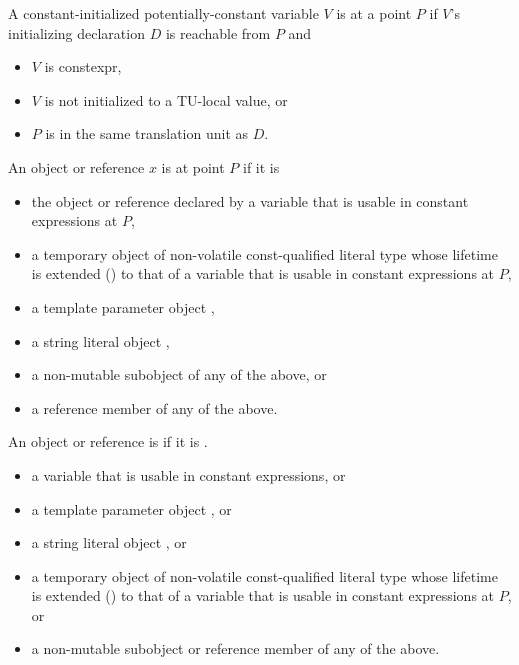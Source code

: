 \documentclass{wg21}
\begin{document}
\pnum
A constant-initialized potentially-constant variable $V$ is
 at a point $P$ if
$V$'s initializing declaration $D$ is reachable from $P$ and
\begin{itemize}
    \item $V$ is constexpr,
    \item $V$ is not initialized to a TU-local value, or
    \item $P$ is in the same translation unit as $D$.
\end{itemize}
\begin{addedblock}
An object or reference $x$ is 
at point $P$ if it is
\begin{itemize}
        \item the object or reference declared by a variable that is usable in constant expressions at $P$,
        \item a temporary object of non-volatile const-qualified literal type
        whose lifetime is extended ()
        to that of a variable that is usable in constant expressions at $P$,
        \item a template parameter object ,
        \item a string literal object ,
        \item a non-mutable subobject of any of the above, or
        \item a reference member of any of the above.
\end{itemize}
\end{addedblock}
An object or reference  is   if it is
.
\begin{removedblock}
\begin{itemize}
    \item a variable that is usable in constant expressions, or
    \item a template parameter object , or
    \item a string literal object , or
    \item a temporary object of non-volatile const-qualified literal type
    whose lifetime is extended ()
    to that of a variable that is usable in constant expressions at $P$, or
    \item a non-mutable subobject or reference member of any of the above.
\end{itemize}
\end{removedblock}
\end{document}
